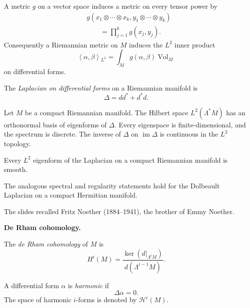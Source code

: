 A metric $g$ on a vector space induces a
metric on every tensor power by
$$
\begin{aligned}
&g(x_1\otimes\cdots\otimes x_k,
y_1\otimes\cdots\otimes y_k)\\
&\qquad
=\prod_{j=1}^kg(x_j,y_j).
\end{aligned}
$$
Consequently a Riemannian metric on $M$
induces the $L^2$ inner product
$$
\left\langle{}\alpha,\beta
\right\rangle{}_{L^2}
=\int_M g(\alpha,\beta)
\operatorname{Vol}_M
$$
on differential forms.

\begin{definition}
\label{definition-laplacian-forms}
The {\it Laplacian on differential forms}
on a Riemannian manifold is
$$
\Delta=dd^*+d^*d.
$$
\end{definition}

\begin{theorem}
\label{theorem-hodge-spectral}
Let $M$ be a compact Riemannian manifold.
The Hilbert space $L^2(\Lambda^*M)$ has an
orthonormal basis of eigenforms of
$\Delta$. Every eigenspace is
finite-dimensional, and the spectrum is
discrete. The inverse of $\Delta$ on
$\operatorname{im}\Delta$ is continuous in
the $L^2$ topology.
\end{theorem}

\begin{theorem}
\label{theorem-laplacian-regularity}
Every $L^2$ eigenform of the Laplacian on a
compact Riemannian manifold is smooth.
\end{theorem}

The analogous spectral and regularity
statements hold for the Dolbeault Laplacian
on a compact Hermitian manifold.

The slides recalled Fritz Noether
(1884--1941), the brother of Emmy Noether.

\medskip\noindent
{\bf De Rham cohomology.}

\begin{definition}
\label{definition-de-rham-cohomology}
The {\it de Rham cohomology} of $M$ is
$$
H^i(M)
=\frac{\ker(d|_{\Lambda^iM})}
{d(\Lambda^{i-1}M)}.
$$
\end{definition}

\begin{definition}
\label{definition-harmonic-form}
A differential form $\alpha$ is
{\it harmonic} if
$$
\Delta\alpha=0.
$$
The space of harmonic $i$-forms is denoted
by $\mathcal{H}^i(M)$.
\end{definition}

